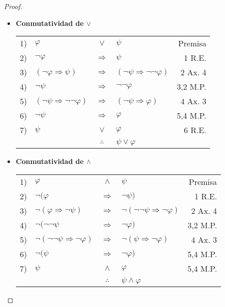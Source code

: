 \documentclass[12pt]{report}
\theoremstyle{largebreak}
\begin{document}
    \begin{proof}
        \begin{itemize}
            \item \textbf{Conmutatividad de $\lor$}
            \begin{center}
                \begin{tabular}{l l c l r}
                    1) & $\varphi$ & $\lor$ & $\psi$ & Premisa \\
                    2) & $\neg\varphi$ & $\Rightarrow$ & $\psi$ & 1 R.E. \\
                    3) & $(\neg\varphi\Rightarrow\psi)$ & $\Rightarrow$ & $(\neg\psi\Rightarrow\neg\neg\varphi)$ & 2 Ax. 4 \\
                    4) & $\neg\psi$ & $\Rightarrow$ & $\neg\neg\varphi$ & 3,2 M.P.\\
                    5) & $(\neg\psi\Rightarrow\neg\neg\varphi)$ & $\Rightarrow$ & $(\neg\psi\Rightarrow\varphi)$ & 4 Ax. 3 \\
                    6) & $\neg\psi$ & $\Rightarrow$ & $\varphi$ & 5,4 M.P. \\
                    7) & $\psi$ & $\lor$ & $\varphi$ & 6 R.E. \\
                    \hline
                    & & $\therefore$ & $\psi\lor\varphi$ & \\
                \end{tabular}
            \end{center}
            \item \textbf{Conmutatividad de $\land$}
            \begin{center}
                \begin{tabular}{l l c l r}
                    1) & $\varphi$ & $\land$ & $\psi$ & Premisa \\
                    2) & $\neg(\varphi$ & $\Rightarrow$ & $\neg\psi)$ & 1 R.E. \\
                    3) & $\neg(\varphi\Rightarrow\neg\psi)$ & $\Rightarrow$ & $\neg(\neg\neg\psi\Rightarrow\neg\varphi)$ & 2 Ax. 4 \\
                    4) & $\neg(\neg\neg\psi$ & $\Rightarrow$ & $\neg\varphi)$ & 3,2 M.P. \\
                    5) & $\neg(\neg\neg\psi\Rightarrow\neg\varphi)$ & $\Rightarrow$ & $\neg(\psi\Rightarrow\neg\varphi)$ & 4 Ax. 3 \\
                    6) & $\neg(\psi$ & $\Rightarrow$ & $\neg\varphi)$ & 5,4 M.P. \\
                    7) & $\psi$ & $\land$ & $\varphi$ & 5,4 M.P. \\
                    \hline
                    & & $\therefore$ & $\psi\land\varphi$ & \\
                \end{tabular}
            \end{center}
        \end{itemize}
    \end{proof}
\end{document}
